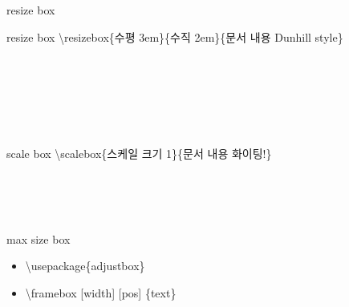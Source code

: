 \documentclass[ aspectratio=149,  14pt,blue,xcolor=pdftex,dvipsnames,table,handout,notes]{beamer}
\begin{document}
		\begin{frame}[t]{resize box}


			\begin{block} {resize box}
			\textbackslash resizebox\{수평 3em\}\{수직 2em\}\{문서 내용 Dunhill style\}

			\end{block}

			\begin{example}
		 \\
		 \\
		 \\
		 \\
		 \\

%
			\end{example}



			\begin{block} {scale box}
			\textbackslash scalebox\{스케일 크기 1\}\{문서 내용 화이팅!\}
			\end{block}

			\begin{example}
		\scalebox{1}{화이팅!}\\
		\scalebox{2}{화이팅!}\\
		\scalebox{3}{화이팅!}\\
			\end{example}


			\begin{block} {max size box}
			\begin{itemize}
			\item[] \textbackslash usepackage\{adjustbox\}
			\item[] \textbackslash framebox [width] [pos] \{text\}
			\end{itemize}
			\end{block}


\end{frame}
\end{document}
